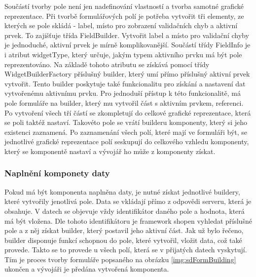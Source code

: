 Součástí tvorby pole není jen nadefinování vlastností a tvorba samotné grafické reprezentace. Při tvorbě formulářových polí je potřeba vytvořit tři elementy, ze kterých se pole skládá - label, místo pro zobrazení validačních chyb a aktivní prvek. To zajišťuje třída FieldBuilder. Vytvořit label a místo pro validační chyby je jednoduché, aktivní prvek je mírně komplikovanější. Součástí třídy FieldInfo je i atribut widgetType, který určuje, jakým typem aktivního prvku má být pole reprezentováno. Na základě tohoto atributu se získává pomocí třídy WidgetBuilderFactory příslušný builder, který umí přímo příslušný aktivní prvek vytvořit. Tento builder poskytuje také funkcionalitu pro získání a nastavení dat vytvořenému aktivnímu prvku. Pro jednoduší přístup k této funkcionalitě, má pole formuláře na builder, který mu vytvořil část s aktivním prvkem, referenci. Po vytvoření všech tří částí se zkompletují do celkové grafické reprezentace, která se poli taktéž nastaví. Takovéto pole se vrátí builderu komponenty, který si jeho existenci zaznamená. Po zaznamenání všech polí, které mají ve formuláři být, se jednotlivé grafické reprezentace polí seskupují do celkového vzhledu komponenty, který se komponentě nastaví a vývojář ho může z komponenty získat.

\subsubsection{Naplnění komponety daty}
Pokud má být komponenta naplněna daty, je nutné získat jednotlivé buildery, které vytvořily jenotlivá pole. Data se vkládají přímo z odpovědi serveru, která je obsahuje. V datech se objevuje vždy identifikátor daného pole a hodnota, která má být vložena. Dle tohoto identifikátoru je framework shopen vyhledat příslušné pole a z něj získat builder, který postavil jeho aktivní část. Jak už bylo řečeno, builder disponuje funkcí schopnou do pole, které vytvořil, vložit data, což také provede. Takto se to provede u všech polí, která se v přijatých datech vyskytují. Tím je proces tvorby formuláře popsaného na obrázku \ref{img:sdFormBuilding} ukončen a vývojáři je předána vytvořená komponenta. 

